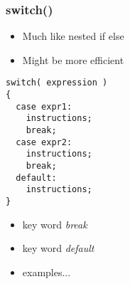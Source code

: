 \documentclass[10pt]{beamer}
\begin{document}
\begin{frame}[fragile]
  \frametitle{switch()}
  \begin{itemize}
    \item Much like nested if else
    \item Might be more efficient
  \end{itemize}
  
    \begin{lstlisting}
switch( expression )
{
  case expr1:
    instructions;
    break;
  case expr2:
    instructions;
    break;
  default:
    instructions;
}
    \end{lstlisting}
    
    \begin{itemize}
      \item key word \textit{break}
      \item key word \textit{default}
      \item examples...
    \end{itemize}
\end{frame}
\end{document}
